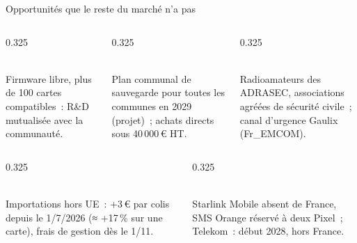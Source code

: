 \begin{frame}{Opportunités que le reste du marché n'a pas}
  \begin{columns}[T]
    \begin{column}{0.325\textwidth}
      \begin{carte}[height=2.4cm,valign=top]
        \raggedright{}\\[1pt]{\footnotesize Firmware libre, plus de 100 cartes compatibles~: R\&D mutualisée avec la communauté.}
      \end{carte}
    \end{column}
    \begin{column}{0.325\textwidth}
      \begin{carte}[height=2.4cm,valign=top]
        \raggedright{}\\[1pt]{\footnotesize Plan communal de sauvegarde pour toutes les communes en 2029 (projet)~; achats directs sous 40\,000\,€ HT.}
      \end{carte}
    \end{column}
    \begin{column}{0.325\textwidth}
      \begin{carte}[height=2.4cm,valign=top]
        \raggedright{}\\[1pt]{\footnotesize Radioamateurs des ADRASEC, associations agréées de sécurité civile~; canal d'urgence Gaulix (Fr\_EMCOM).}
      \end{carte}
    \end{column}
  \end{columns}
  \vspace{0.05cm}
  \begin{columns}[T]
    \begin{column}{0.325\textwidth}
      \begin{carte}[height=2.4cm,valign=top]
        \raggedright{}\\[1pt]{\footnotesize Importations hors UE~: +3\,€ par colis depuis le 1/7/2026 (≈ +17\,\% sur une carte), frais de gestion dès le 1/11.}
      \end{carte}
    \end{column}
    \begin{column}{0.325\textwidth}
      \begin{carte}[height=2.4cm,valign=top]
        \raggedright{}\\[1pt]{\footnotesize Starlink Mobile absent de France, SMS Orange réservé à deux Pixel~; Telekom~: début 2028, hors France.}

\end{carte}
\end{column}
\end{columns}
\end{frame}
